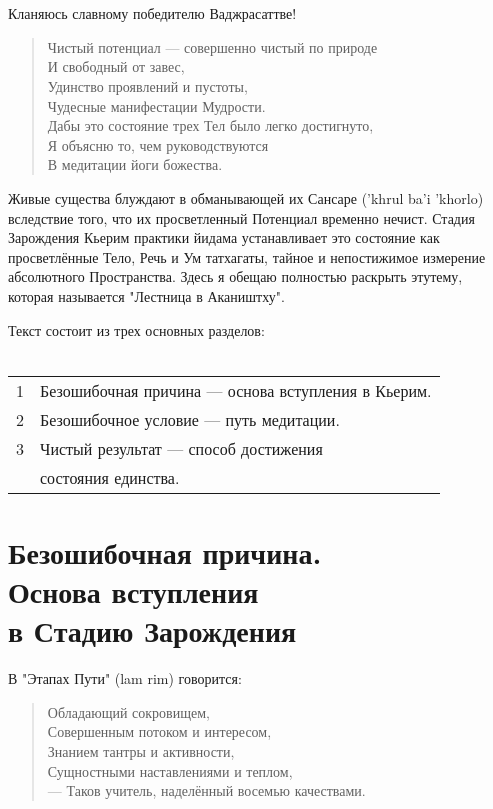 
\section*{}
Кланяюсь славному победителю Ваджрасаттве!

\begin{verse}
Чистый потенциал — совершенно чистый по природе\\
И свободный от завес,\\
Удинство проявлений и пустоты,\\
Чудесные манифестации Мудрости.\\
Дабы это состояние трех Тел было легко достигнуто,\\
Я объясню то, чем руководствуются\\
В медитации йоги божества.
\end{verse}

Живые существа блуждают в обманывающей их Сансаре ('khrul ba'i 'khorlo)
вследствие того, что их просветленный Потенциал временно нечист.
Стадия Зарождения Кьерим практики йидама устанавливает это
состояние как просветлённые Тело, Речь и Ум татхагаты, тайное
и непостижимое измерение абсолютного Пространства. Здесь я
обещаю полностью раскрыть этутему, которая называется "Лестница в Акаништху".

Текст состоит из трех основных разделов:\\
\\
\begin{tabular}{ll}
1 & Безошибочная причина — основа вступления в Кьерим.\\
2 & Безошибочное условие — путь медитации.\\
3 & Чистый результат — способ достижения \\
  & состояния единства.
\end{tabular}

\newpage
\section{Безошибочная причина.\\Основа вступления \\в Стадию Зарождения}

В "Этапах Пути" (lam rim) говорится:

\begin{verse}
Обладающий сокровищем,\\
Совершенным потоком и интересом,\\
Знанием тантры и активности,\\
Сущностными наставлениями и теплом,\\
— Таков учитель, наделённый восемью качествами.
\end{verse}

